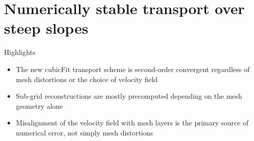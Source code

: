 \chapter{Numerically stable transport over steep slopes}
\label{ch:cubicFit}

\begin{highlights}
{\Large Highlights}
\begin{itemize}
	\item The new cubicFit transport scheme is second-order convergent regardless of mesh distortions or the choice of velocity field
	\item Sub-grid reconstructions are mostly precomputed depending on the mesh geometry alone
	\item Misalignment of the velocity field with mesh layers is the primary source of numerical error, not simply mesh distortions
\end{itemize}
\end{highlights}









